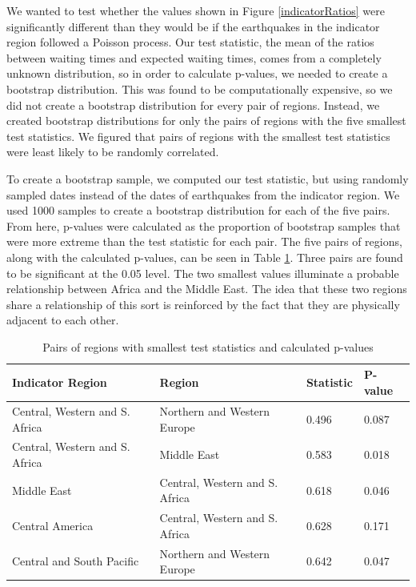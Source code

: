 \documentclass{article}
\begin{document}
We wanted to test whether the values shown in Figure \ref{indicatorRatios} were significantly different than they would be if the earthquakes in the indicator region followed a Poisson process. Our test statistic, the mean of the ratios between waiting times and expected waiting times, comes from a completely unknown distribution, so in order to calculate p-values, we needed to create a bootstrap distribution. This was found to be computationally expensive, so we did not create a bootstrap distribution for every pair of regions. Instead, we created bootstrap distributions for only the pairs of regions with the five smallest test statistics. We figured that pairs of regions with the smallest test statistics were least likely to be randomly correlated. 

To create a bootstrap sample, we computed our test statistic, but using randomly sampled dates instead of the dates of earthquakes from the indicator region. We used 1000 samples to create a bootstrap distribution for each of the five pairs. From here, p-values were calculated as the proportion of bootstrap samples that were more extreme than the test statistic for each pair. The five pairs of regions, along with the calculated p-values, can be seen in Table \ref{p_value_table}. Three pairs are found to be significant at the 0.05 level. The two smallest values illuminate a probable relationship between Africa and the Middle East. The idea that these two regions share a relationship of this sort is reinforced by the fact that they are physically adjacent to each other.


\begin{table}
  \caption{Pairs of regions with smallest test statistics and calculated p-values}
  \label{p_value_table}
  \centering
  \begin{tabular}{llll}
    \toprule
    \cmidrule(r){1-2}
    Indicator Region     & Region  & Statistic   & P-value \\
    \midrule
    Central, Western and S. Africa & Northern and Western Europe & 0.496 & 0.087 \\ 
    Central, Western and S. Africa & Middle East & 0.583 & 0.018 \\
    Middle East & Central, Western and S. Africa & 0.618 & 0.046 \\
    Central America & Central, Western and S. Africa & 0.628 & 0.171 \\
    Central and South Pacific & Northern and Western Europe & 0.642 & 0.047 \\
    \bottomrule
  \end{tabular}
\end{table}
\end{document}
